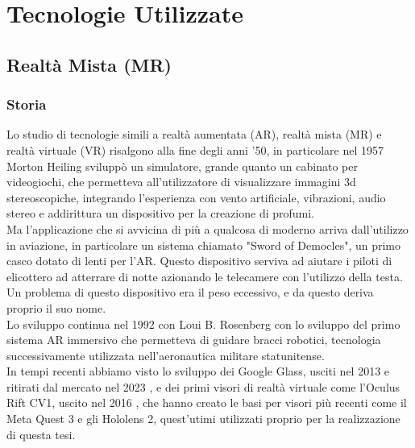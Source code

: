 \chapter{Tecnologie Utilizzate}
\pagestyle{plain}


\section{Realtà Mista (MR)}

\subsection{Storia}
Lo studio di tecnologie simili a realtà aumentata (AR), realtà mista (MR) e realtà virtuale (VR) risalgono alla fine degli anni '50, in particolare nel 1957 Morton Heiling sviluppò un simulatore, grande quanto un cabinato per videogiochi, che permetteva all'utilizzatore di visualizzare immagini 3d stereoscopiche, integrando l'esperienza con vento artificiale, vibrazioni, audio stereo e addirittura un dispositivo per la creazione di profumi.\\Ma l'applicazione che si avvicina di più a qualcosa di moderno arriva dall'utilizzo in aviazione, in particolare un sistema chiamato "Sword of Democles", un primo casco dotato di lenti per l'AR. Questo dispositivo serviva ad aiutare i piloti di elicottero ad atterrare di notte azionando le telecamere con l'utilizzo della testa. Un problema di questo dispositivo era il peso eccessivo, e da questo deriva proprio il suo nome. \\ Lo sviluppo continua nel 1992 con Loui B. Rosenberg con lo sviluppo del primo sistema AR immersivo che permetteva di guidare bracci robotici, tecnologia successivamente utilizzata nell'aeronautica militare statunitense. \cite{OverviewofAugmentedReality}
\\ In tempi recenti abbiamo visto lo sviluppo dei Google Glass, usciti nel 2013 e ritirati dal mercato nel 2023 \cite{EndofGoogleGlass}, e dei primi visori di realtà virtuale come l'Oculus Rift CV1, uscito nel 2016 \cite{OculusRift1}, che hanno creato le basi per visori più recenti come il Meta Quest 3 e gli Hololens 2, quest'utimi utilizzati proprio per la realizzazione di questa tesi.

